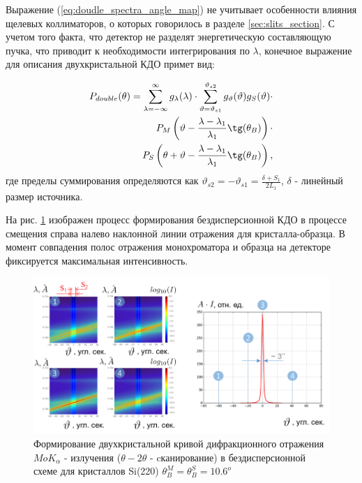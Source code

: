 Выражение (\ref{eq:doudle_spectra_angle_map}) не учитывает особенности влияния
 щелевых коллиматоров, о которых говорилось в
разделе \ref{sec:slits_section}. С учетом того факта, что детектор не разделят
 энергетическую составляющую пучка, что приводит к необходимости интегрирования по $\lambda$,
конечное выражение для описания двухкристальной КДО примет вид:

\begin{eqnarray} \label{eq:doudle_spectra_angle_map_on_detector}
  P_{double}(\theta) = \sum_{\lambda = -\infty}^{\infty}g_{\lambda}(\lambda)\cdot
  \sum_{\vartheta = \vartheta_{s1}}^{\vartheta_{s2}} g_{\vartheta}(\vartheta) g_{S}(\vartheta) \cdot \nonumber \\
   P_M \left(\vartheta - \frac{\lambda - \lambda_1}{\lambda_1}\tg(\theta_B) \right) \cdot \nonumber \\
   P_S \left(\theta + \vartheta - \frac{\lambda - \lambda_1}{\lambda_1}\tg(\theta_B)\right),
 \end{eqnarray}
 \noindent
 где пределы суммирования определяются как $\vartheta_{s2} = - \vartheta_{s1} = \frac{\delta+S_1}{2L_1}$,
 $\delta$ - линейный размер источника.

 На рис. \ref{ris:double_crystal_form_kdo} изображен процесс формирования
 бездисперсионной КДО в процессе смещения справа налево наклонной линии отражения
 для кристалла-образца. В момент совпадения полос отражения монохроматора и образца
 на детекторе фиксируется максимальная интенсивность.

 \begin{figure}[H]
   \centering
   \includegraphics[width=1\textwidth]{images/double_crystal_form_kdo.png}
   \caption{Формирование двухкристальной кривой дифракционного отражения $MoK_{\alpha}$ - излучения
    ($\theta - 2\theta$ - cканирование) в бездисперсионной схеме для кристаллов Si(220)
   $\theta_B^M = \theta_B^S = 10.6^o$ }
   \label{ris:double_crystal_form_kdo}
 \end{figure}

